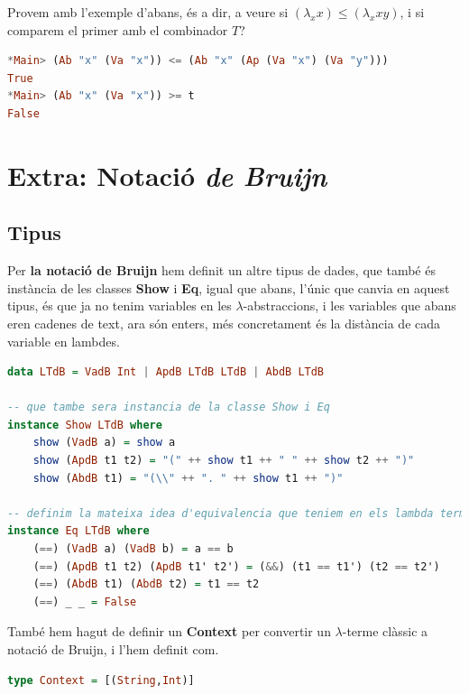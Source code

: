 \documentclass[10pt,a4paper]{article}
\begin{document}
Provem amb l'exemple d'abans, és a dir, a veure si $(\lambda_x x) \leq (\lambda_x x y)$, i si comparem el primer amb el combinador $T$?

\begin{lstlisting}[language=Haskell]
*Main> (Ab "x" (Va "x")) <= (Ab "x" (Ap (Va "x") (Va "y")))
True
*Main> (Ab "x" (Va "x")) >= t
False
\end{lstlisting}

\clearpage

\section{Extra: Notació \textit{de Bruijn}}

\subsection{Tipus}

Per \textbf{la notació de Bruijn} hem definit un altre tipus de dades, que també és instància de les classes \textbf{Show} i \textbf{Eq}, igual que abans, l'únic que canvia en aquest tipus, és que ja no tenim variables en les $\lambda$-abstraccions, i les variables que abans eren cadenes de text, ara són enters, més concretament és la distància de cada variable en lambdes.

\begin{lstlisting}[language=Haskell]
data LTdB = VadB Int | ApdB LTdB LTdB | AbdB LTdB

-- que tambe sera instancia de la classe Show i Eq
instance Show LTdB where
    show (VadB a) = show a
    show (ApdB t1 t2) = "(" ++ show t1 ++ " " ++ show t2 ++ ")"
    show (AbdB t1) = "(\\" ++ ". " ++ show t1 ++ ")"

-- definim la mateixa idea d'equivalencia que teniem en els lambda termes pels lambda termes amb notacio de Bruijn
instance Eq LTdB where
    (==) (VadB a) (VadB b) = a == b
    (==) (ApdB t1 t2) (ApdB t1' t2') = (&&) (t1 == t1') (t2 == t2')
    (==) (AbdB t1) (AbdB t2) = t1 == t2
    (==) _ _ = False
\end{lstlisting}

També hem hagut de definir un \textbf{Context} per convertir un $\lambda$-terme clàssic a notació de Bruijn, i l'hem definit com.

\begin{lstlisting}[language=Haskell]
type Context = [(String,Int)]
\end{lstlisting}
\end{document}
